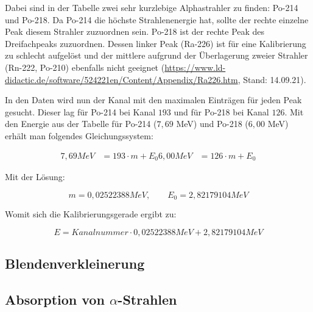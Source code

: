 
Dabei sind in der Tabelle zwei sehr kurzlebige Alphastrahler zu finden: Po-214 und Po-218. Da Po-214 die höchste Strahlenenergie hat, 
sollte der rechte einzelne Peak diesem Strahler zuzuordnen sein. Po-218 ist der rechte Peak des Dreifachpeaks zuzuordnen. Dessen 
linker Peak (Ra-226) ist für eine Kalibrierung zu schlecht aufgelöst und der mittlere aufgrund der Überlagerung zweier Strahler 
(Rn-222, Po-210) ebenfalls nicht geeignet
(\url{https://www.ld-didactic.de/software/524221en/Content/Appendix/Ra226.htm}, Stand: 14.09.21).

In den Daten wird nun der Kanal mit den maximalen Einträgen für jeden Peak gesucht. Dieser lag für Po-214 bei Kanal $193$ und 
für Po-218 bei Kanal $126$. Mit den Energie aus der Tabelle für Po-214 ($7,69$ MeV) und Po-218 ($6,00$ MeV) erhält man folgendes 
Gleichungssystem:

\begin{align*}{}
    7,69 MeV &= 193 \cdot m + E_0
    6,00 MeV &= 126 \cdot m + E_0
\end{align*}

Mit der Lösung:

\begin{equation*}
    m = 0,02522388 MeV, \qquad E_0 = 2,82179104 MeV
\end{equation*}

Womit sich die Kalibrierungsgerade ergibt zu:

\begin{equation}
    E = Kanalnummer \cdot 0,02522388 MeV + 2,82179104 MeV
\end{equation}


\subsection{Blendenverkleinerung}

\subsection{Absorption von $\alpha$-Strahlen}
